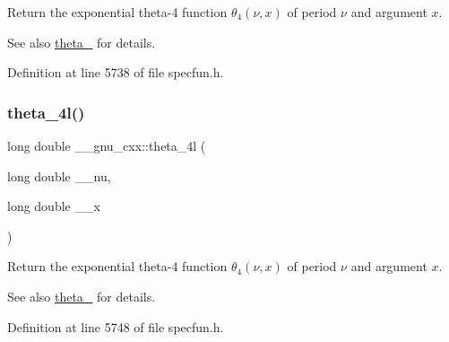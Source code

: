 Return the exponential theta-\/4 function $ \theta_4(\nu,x) $ of period $ \nu $ and argument $ x $.

\begin{DoxySeeAlso}{See also}
\hyperlink{group__gnu__math__spec__func_ga8a6f8b69272a9f205a13e1745832ada3}{theta\+\_} for details. 
\end{DoxySeeAlso}


Definition at line 5738 of file specfun.\+h.

\mbox{\label{group__gnu__math__spec__func_gaaf63a80e90cdcdd66ebb18cd3a84afae}} 
\subsubsection{\texorpdfstring{theta\+\_\+4l()}{theta\_4l()}}
{\footnotesize\ttfamily long double \+\_\+\+\_\+gnu\+\_\+cxx\+::theta\+\_\+4l (\begin{DoxyParamCaption}\item[{long double}]{\+\_\+\+\_\+nu,  }\item[{long double}]{\+\_\+\+\_\+x }\end{DoxyParamCaption})\hspace{0.3cm}{\ttfamily [inline]}}

Return the exponential theta-\/4 function $ \theta_4(\nu,x) $ of period $ \nu $ and argument $ x $.

\begin{DoxySeeAlso}{See also}
\hyperlink{group__gnu__math__spec__func_ga8a6f8b69272a9f205a13e1745832ada3}{theta\+\_} for details. 
\end{DoxySeeAlso}


Definition at line 5748 of file specfun.\+h.

\mbox{\label{group__gnu__math__spec__func_ga3ebbb6513c39e1d55b08cba7d169ce3d}} 
